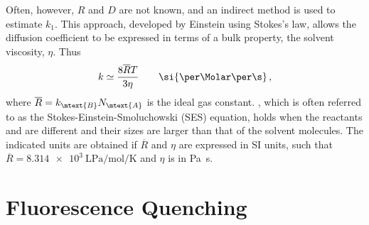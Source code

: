 Often, however, \( R \) and \( D \) are not known, and an indirect method is used to estimate \( k_1 \). 
This approach, developed by Einstein using Stokes's law, allows the diffusion coefficient to be expressed in terms of a bulk property, the solvent viscosity, \( \eta \). Thus
\begin{equation}
	k \simeq \frac{8 \overline{R} T}{3 \eta} \qquad \si{\per\Molar \per \s} \, ,
	\label{eq:rateapprox}
\end{equation}
where \( \overline{R} = k_\mtext{B} N_\mtext{A} \) is the ideal gas constant.%
, which is often referred to as the Stokes-Einstein-Smoluchowski (SES) equation, holds when the reactants  and  are different and their sizes are larger than that of the solvent molecules. 
The indicated units are obtained if \( \overline{R} \) and \( \eta \) are expressed in SI units, such that \( \overline{R} = \SI{8.314e3}{\L \Pa \per \mol \per \K} \) and \( \eta \) is in \si[inter-unit-product=\ensuremath{{}\!\cdot\!{}}]{\Pa \s}.

\section{Fluorescence Quenching} %
\label{sec:fl_quenching}

